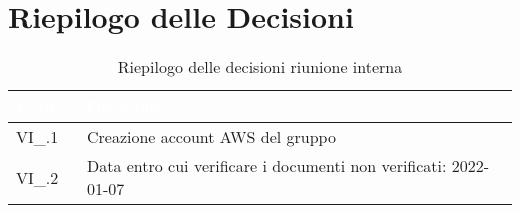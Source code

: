 \section{Riepilogo delle Decisioni}


\begin{table}[!htbp]
\renewcommand{\arraystretch}{1.5}
\begin{tabular}{m{}<{\centering}  m{}<{\centering}}
\rowcolor{darkblue} \textcolor{white}{\textbf{Codice}} & \textcolor{white}{\textbf{Decisione}} \\
\hline
VI\_\D{}.1 & Creazione account AWS del gruppo\\
\rowcolor{gray!25} VI\_\D{}.2 & Data entro cui verificare i documenti non verificati: 2022-01-07\\
\end{tabular}
\caption{Riepilogo delle decisioni riunione interna \D{}}
\end{table}